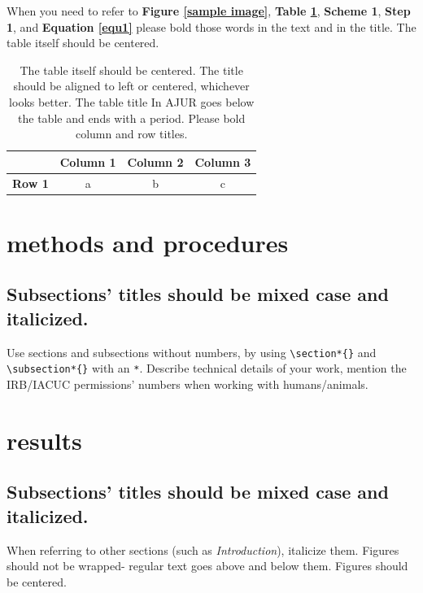 \documentclass[10pt]{article}
\begin{document}
When you need to refer to \textbf{Figure \ref{sample image}}, \textbf{Table \ref{sample table}}, \textbf{Scheme 1}, \textbf{Step 1}, and \textbf{Equation \ref{equ1}} please bold those words in the text and in the title. The table itself should be centered.

\begin{table}[htp!]
\begin{center}
\begin{tabular}{ | c | c | c | c | }
\hline
 & \textbf{Column 1} & \textbf{Column 2} & \textbf{Column 3} \\
 \hline
 \textbf{Row 1} & a & b & c \\
 \hline
\end{tabular}
\caption{The table itself should be centered. The title should be aligned to left or centered, whichever looks better. The table title In AJUR goes below the table and ends with a period. Please bold column and row titles.}
\label{sample table}
\end{center}
\end{table}

\section*{methods and procedures}

\subsection*{Subsections' titles should be mixed case and italicized.}
Use sections and subsections without numbers, by using \verb+\section*{}+ and \verb+\subsection*{}+ with an \verb+*+. Describe technical details of your work,\cite{journal,chapters} mention the IRB/IACUC permissions' numbers when working with humans/animals.

\section*{results}
\subsection*{Subsections' titles should be mixed case and italicized.}
When referring to other sections (such as \textit{Introduction}), italicize them. Figures should not be wrapped- regular text goes above and below them. Figures should be centered.
\end{document}
